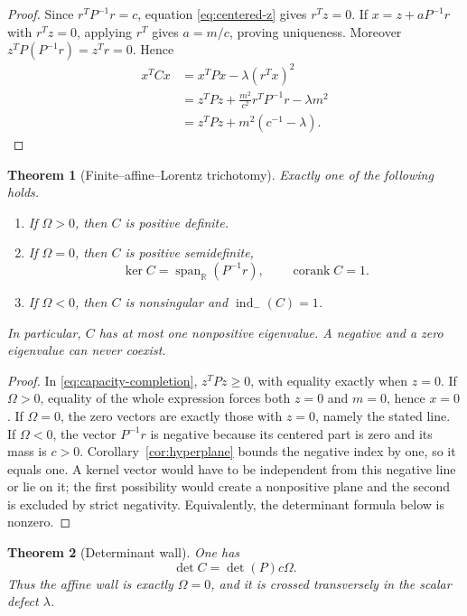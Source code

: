 \documentclass[11pt,a4paper]{amsart}
\theoremstyle{plain}
\newtheorem{theorem}{Theorem}[section]
\theoremstyle{definition}
\newcommand{\RR}{\mathbb R}
\newcommand{\corank}{\operatorname{corank}}
\newcommand{\indm}{\operatorname{ind}_{-}}
\newcommand{\spanr}{\operatorname{span}_{\RR}}
\begin{document}
\begin{proof}
Since $r^TP^{-1}r=c$, equation \eqref{eq:centered-z} gives $r^Tz=0$.  If
$x=z+aP^{-1}r$ with $r^Tz=0$, applying $r^T$ gives $a=m/c$, proving uniqueness.  Moreover
$z^TP(P^{-1}r)=z^Tr=0$.  Hence
\begin{align*}
 x^TCx
 &=x^TPx-\lambda(r^Tx)^2\\
 &=z^TPz+\frac{m^2}{c^2}r^TP^{-1}r-\lambda m^2\\
 &=z^TPz+m^2(c^{-1}-\lambda).
\end{align*}
\end{proof}

\begin{theorem}[Finite--affine--Lorentz trichotomy]\label{thm:trichotomy}
Exactly one of the following holds.
\begin{enumerate}[label=(\roman*),leftmargin=2.2em]
\item If $\Omega>0$, then $C$ is positive definite.
\item If $\Omega=0$, then $C$ is positive semidefinite,
\[
             \ker C=\spanr(P^{-1}r),\qquad \corank C=1.
\]
\item If $\Omega<0$, then $C$ is nonsingular and $\indm(C)=1$.
\end{enumerate}
In particular, $C$ has at most one nonpositive eigenvalue.  A negative and a zero eigenvalue can
never coexist.
\end{theorem}

\begin{proof}
In \eqref{eq:capacity-completion}, $z^TPz\ge0$, with equality exactly when $z=0$.
If $\Omega>0$, equality of the whole expression forces both $z=0$ and $m=0$, hence $x=0$.
If $\Omega=0$, the zero vectors are exactly those with $z=0$, namely the stated line.
If $\Omega<0$, the vector $P^{-1}r$ is negative because its centered part is zero and its mass is
$c>0$.  Corollary~\ref{cor:hyperplane} bounds the negative index by one, so it equals one.  A kernel
vector would have to be independent from this negative line or lie on it; the first possibility
would create a nonpositive plane and the second is excluded by strict negativity.  Equivalently,
the determinant formula below is nonzero.
\end{proof}

\begin{theorem}[Determinant wall]\label{thm:determinant}
One has
\begin{equation}\label{eq:determinant}
                   \boxed{\quad\det C=\det(P)c\Omega.\quad}
\end{equation}
Thus the affine wall is exactly $\Omega=0$, and it is crossed transversely in the scalar defect
$\lambda$.
\end{theorem}
\end{document}
